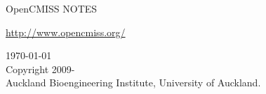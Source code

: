 \thispagestyle{empty}

\begin{center}
   \huge OpenCMISS NOTES
   \vspace{10mm}   

   \large \url{http://www.opencmiss.org/}
   \vspace{10mm}   

   \begin{figure}[htbp] \centering
   \end{figure} %

   \vspace{10mm}
   \today\\   %
   \vspace{55mm}
   \small
   \textcopyright \thickspace Copyright 2009-\\
   Auckland Bioengineering Institute, University of Auckland.
\end{center}






